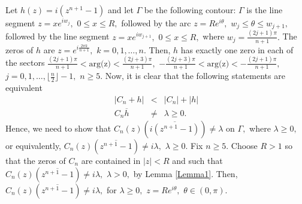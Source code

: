 \documentclass[final]{siamltex}
\begin{document}
 
 Let $h(z) = i(z^{n+1}-1)$ and let $\Gamma$ be the following contour: $\Gamma$ is the line segment $z = xe^{iw_{j}},$ $0 \leq x \leq R,$ followed by the arc $z = Re^{i \theta},$ $w_{j} \leq \theta \leq w_{j+1},$ followed by the line segment $z = xe^{i w_{j+1}},$ $0 \leq x \leq R,$ where $w_{j} = \frac{(2j+1) \pi}{n+1}.$     
 The zeros of $h$ are $z = e^{i \frac{2\pi k}{n+1}},$ $k = 0,1, \ldots, n.$ 
 Then, $h$ has exactly one zero in each of the sectors $\frac{ (2j+1)\pi}{n+1} < \mbox{arg(z)} < \frac{ (2j+3)\pi}{n+1},$ $-\frac{ (2j+3)\pi}{n+1} < \mbox{arg(z)} < -\frac{ (2j+1)\pi}{n+1},$  $j = 0, 1, \ldots, \lfloor \frac{n}{2} \rfloor -1,$ $n \geq 5.$  \newline
Now, it is clear that the following statements are equivalent
 \begin{eqnarray*} \left| C_{n}+h \right| & < & \left| C_{n} \right| + \left| h \right|  \\ 
   C_{n} \overline{h} & \neq & \lambda \geq 0.
 \end{eqnarray*}
 Hence, we need to show that $C_{n}(z) \left( \overline{ i(z^{n+1}-1)} \right) \neq \lambda$ on $\Gamma,$ where $\lambda \geq 0,$ or equivalently, $C_{n}(z) \left( \overline{z^{n+1}-1} \right) \neq i \lambda,$ $\lambda \geq 0.$ 
 Fix $n \geq 5.$ 
 Choose $R > 1$ so that the zeros of $C_{n}$ are contained in $|z| < R$ and such that $C_{n}(z) \left( \overline{z^{n+1}-1} \right) \neq i \lambda,$ $\lambda > 0,$ by Lemma \ref{Lemma1}. 
 Then, $C_{n}(z) \left( \overline{z^{n+1}-1} \right) \neq i \lambda,$  for $\lambda \geq 0,$ $z = Re^{i\theta},$ $\theta \in (0, \pi).$ 
 
\end{document}
